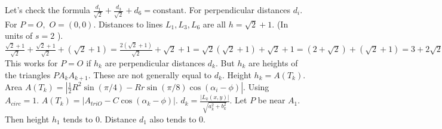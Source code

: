 Let's check the formula $\frac{d_1}{\sqrt{2}} + \frac{d_3}{\sqrt{2}} + d_6 = \text{constant}.$ For perpendicular distances $d_i.$ 
For $P=O,$ $O=(0,0).$ Distances to lines $L_1, L_3, L_6$ are all $h=\sqrt{2}+1.$ (In units of $s=2$ ). 
$\frac{\sqrt{2}+1}{\sqrt{2}} + \frac{\sqrt{2}+1}{\sqrt{2}} + (\sqrt{2}+1) = \frac{2(\sqrt{2}+1)}{\sqrt{2}} + \sqrt{2}+1 = \sqrt{2}(\sqrt{2}+1) + \sqrt{2}+1 = (2+\sqrt{2}) + (\sqrt{2}+1) = 3+2\sqrt{2}.$ 
This works for $P=O$ if $h_k$ are perpendicular distances $d_k.$ 
But $h_k$ are heights of the triangles $PA_kA_{k+1}.$ These are not generally equal to $d_k.$ 
Height $h_k = A(T_k).$ Area $A(T_k) = |\frac{1}{2} R^2 \sin(\pi/4) - R r \sin(\pi/8) \cos(\alpha_i - \phi)|.$ Using $A_{circ}=1.$ 
$A(T_k) = | A_{triO} - C \cos(\alpha_k - \phi) |.$ 
$d_k = \frac{|L_k(x,y)|}{\sqrt{a_k^2+b_k^2}}.$ 
Let $P$ be near $A_1.$ Then height $h_1$ tends to 0. Distance $d_1$ also tends to 0.

